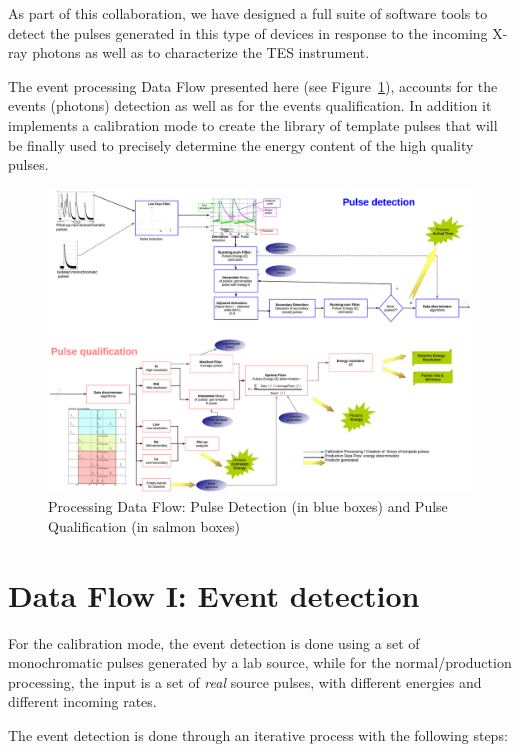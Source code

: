 As part of this collaboration, we have designed a full suite of software tools \citep{ceballos_2011} to detect the pulses generated in this type of devices in response to the incoming X-ray photons as well as to characterize the TES instrument. 

The event processing Data Flow presented here (see Figure~\ref{dataflow}), accounts for the events (photons) detection \citep{ceballos_2012} as well as for the events qualification. In addition it implements a calibration mode to create the library of template pulses that will be finally used to precisely determine the energy content of the high quality pulses.

\begin{figure}
\centering
\includegraphics[angle=90,width=\textwidth]{part2/Ceballos_P009/P009_f1.eps} 
\caption{Processing Data Flow: Pulse Detection (in blue boxes) and Pulse Qualification (in salmon boxes)}
\label{dataflow}
\end{figure}

\section{Data Flow I: Event detection}
For the calibration mode, the event detection is done using a set of monochromatic pulses generated by a lab source, while for the normal/production processing, the input is a set of \textit{real} source pulses, with different energies and different incoming rates.

The event detection is done through an iterative process with the following steps:

